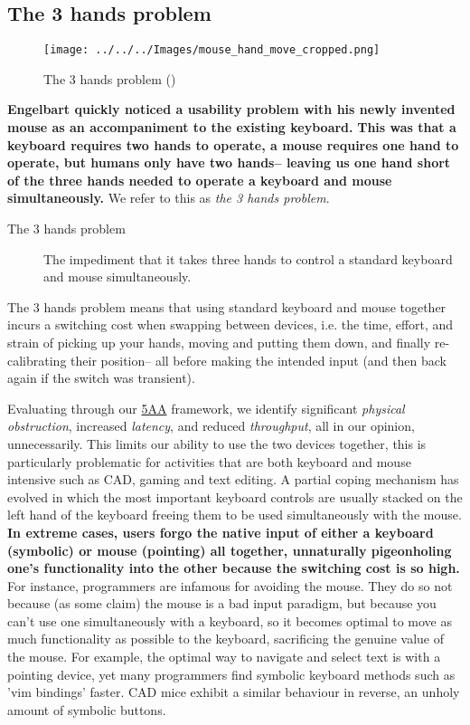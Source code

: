 \documentclass[logo,bsc,singlespacing,parskip]{infthesis}
\begin{document}
\subsection{The 3 hands problem}
\label{sec:org34ed016}
\begin{figure}[h]
\centering
\texttt{[image: ../../../Images/mouse\_hand\_move\_cropped.png]}
\caption{The 3 hands problem (\autocite{ZergoFreedomErgonomics})}
\end{figure}

\textbf{Engelbart quickly noticed a usability problem with his newly invented mouse as an accompaniment to the existing keyboard.}
\textbf{This was that a keyboard requires two hands to operate, a mouse requires one hand to operate, but humans only have two hands-- leaving us one hand short of the three hands needed to operate a keyboard and mouse simultaneously.}
We refer to this as \emph{the 3 hands problem}.

\begin{mdframed}
\begin{description}
\item[{The 3 hands problem}] The impediment that it takes three hands to control a standard keyboard and mouse simultaneously.
\end{description}
\end{mdframed}

The 3 hands problem means that using standard keyboard and mouse together incurs a switching cost when swapping between devices, i.e. the time, effort, and strain of picking up your hands, moving and putting them down, and finally re-calibrating their position-- all before making the intended input (and then back again if the switch was transient).

Evaluating through our \hyperref[orgce96c46]{5AA} framework, we identify significant \emph{physical obstruction}, increased \emph{latency}, and reduced \emph{throughput}, all in our opinion, unnecessarily.
This limits our ability to use the two devices together, this is particularly problematic for activities that are both keyboard and mouse intensive such as CAD, gaming and text editing.
A partial coping mechanism has evolved in which the most important keyboard controls are usually stacked on the left hand of the keyboard freeing them to be used simultaneously with the mouse.
\textbf{In extreme cases, users forgo the native input of either a keyboard (symbolic) or mouse (pointing) all together, unnaturally pigeonholing one's functionality into the other because the switching cost is so high.}
For instance, programmers are infamous for avoiding the mouse.
They do so not because (as some claim) the mouse is a bad input paradigm, but because you can't use one simultaneously with a keyboard, so it becomes optimal to move as much functionality as possible to the keyboard, sacrificing the genuine value of the mouse.
For example, the optimal way to navigate and select text is with a pointing device,  yet many programmers find symbolic keyboard methods such as 'vim bindings' faster.
CAD mice exhibit a similar behaviour in reverse, an unholy amount of symbolic buttons.
\end{document}
